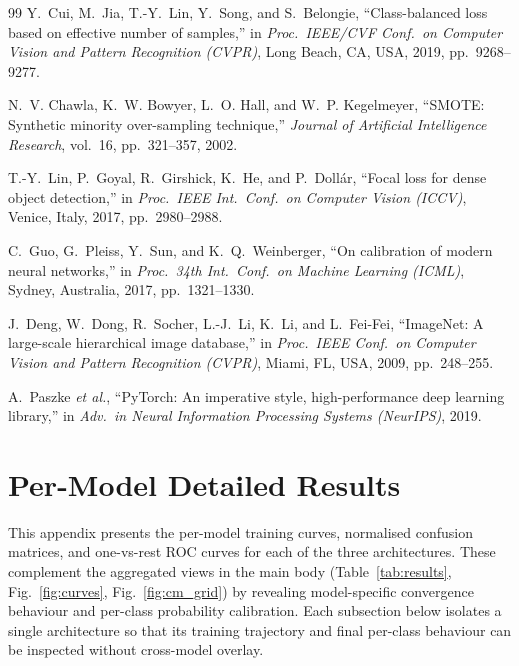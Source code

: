\documentclass[conference,10pt]{IEEEtran}
\begin{document}
\begin{thebibliography}{99}
Y.~Cui, M.~Jia, T.-Y.~Lin, Y.~Song, and S.~Belongie,
``Class-balanced loss based on effective number of samples,''
in \emph{Proc.\ IEEE/CVF Conf.\ on Computer Vision and Pattern Recognition (CVPR)},
Long Beach, CA, USA, 2019, pp.~9268--9277.

N.~V. Chawla, K.~W. Bowyer, L.~O. Hall, and W.~P. Kegelmeyer,
``SMOTE: Synthetic minority over-sampling technique,''
\emph{Journal of Artificial Intelligence Research}, vol.~16, pp.~321--357, 2002.

T.-Y.~Lin, P.~Goyal, R.~Girshick, K.~He, and P.~Doll\'ar,
``Focal loss for dense object detection,''
in \emph{Proc.\ IEEE Int.\ Conf.\ on Computer Vision (ICCV)}, Venice, Italy,
2017, pp.~2980--2988.

C.~Guo, G.~Pleiss, Y.~Sun, and K.~Q.~Weinberger,
``On calibration of modern neural networks,''
in \emph{Proc.\ 34th Int.\ Conf.\ on Machine Learning (ICML)}, Sydney,
Australia, 2017, pp.~1321--1330.

J.~Deng, W.~Dong, R.~Socher, L.-J.~Li, K.~Li, and L.~Fei-Fei,
``ImageNet: A large-scale hierarchical image database,''
in \emph{Proc.\ IEEE Conf.\ on Computer Vision and Pattern Recognition (CVPR)},
Miami, FL, USA, 2009, pp.~248--255.

A.~Paszke \emph{et al.},
``PyTorch: An imperative style, high-performance deep learning library,''
in \emph{Adv.\ in Neural Information Processing Systems (NeurIPS)}, 2019.

\end{thebibliography}

\appendices

\section{Per-Model Detailed Results}\label{app:perm}

This appendix presents the per-model training curves, normalised confusion
matrices, and one-vs-rest ROC curves for each of the three architectures.
These complement the aggregated views in the main body
(Table~\ref{tab:results}, Fig.~\ref{fig:curves}, Fig.~\ref{fig:cm_grid}) by
revealing model-specific convergence behaviour and per-class probability
calibration. Each subsection below isolates a single architecture so that
its training trajectory and final per-class behaviour can be inspected
without cross-model overlay.
\end{document}
